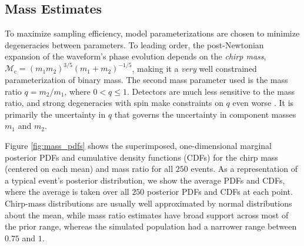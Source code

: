 \subsection{Mass Estimates}\label{sec:mass}
To maximize sampling efficiency, model parameterizations are chosen to minimize degeneracies between parameters.  To leading order, the post-Newtonian expansion of the waveform's phase evolution depends on the \emph{chirp mass}, $\mathcal{M}_\mathrm{c} = (m_1 m_2)^{3/5} (m_1 + m_2)^{-1/5}$, making it a \emph{very} well constrained parameterization of binary mass.  The second mass parameter used is the mass ratio $q = m_2/m_1$, where $0 < q \leq 1$.  Detectors are much less sensitive to the mass ratio, and strong degeneracies with spin make constraints on $q$ even worse \citep{Cutler_1994}.  It is primarily the uncertainty in $q$ that governs the uncertainty in component masses $m_1$ and $m_2$.

Figure \ref{fig:mass_pdfs} shows the superimposed, one-dimensional marginal posterior PDFs and cumulative density functions (CDFs) for the chirp mass (centered on each mean) and mass ratio for all $250$ events.  As a representation of a typical event's posterior distribution, we show the average PDFs and CDFs, where the average is taken over all $250$ posterior PDFs and CDFs at each point. Chirp-mass distributions are usually well approximated by normal distributions about the mean, while mass ratio estimates have broad support across most of the prior range, whereas the simulated population had a narrower range between $0.75$ and $1$.


